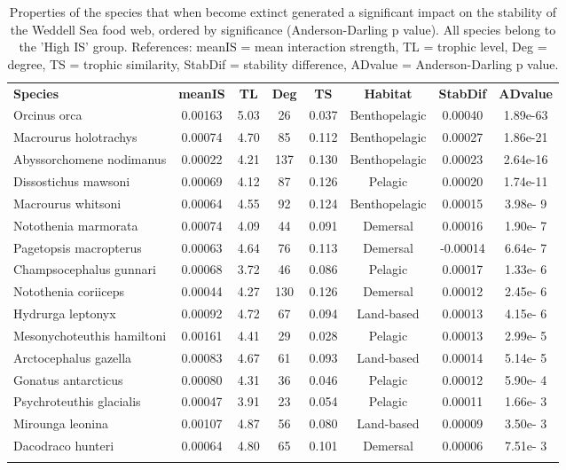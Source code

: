 \documentclass[gc, manuscript]{copernicus}
\begin{document}
\begin{table}[t]
\caption{Properties of the species that when become extinct generated a significant impact on the stability of the Weddell Sea food web, ordered by significance (Anderson-Darling p value). All species belong to the 'High IS' group.  References: meanIS = mean interaction strength, TL = trophic level, Deg = degree, TS = trophic similarity, StabDif = stability difference, ADvalue = Anderson-Darling p value.}
\begin{tabular}{l c c c c c c c}
\tophline

\textbf{Species} & \textbf{meanIS} & \textbf{TL} & \textbf{Deg} & \textbf{TS} & \textbf{Habitat} & \textbf{StabDif} & \textbf{ADvalue}\\
\middlehline
Orcinus orca & 0.00163 & 5.03 & 26 & 0.037 & Benthopelagic & 0.00040 & 1.89e-63 \\
\middlehline
Macrourus holotrachys & 0.00074 & 4.70 & 85 & 0.112 & Benthopelagic & 0.00027 & 1.86e-21 \\
\middlehline
Abyssorchomene nodimanus & 0.00022 & 4.21 & 137 & 0.130 & Benthopelagic & 0.00023 & 2.64e-16 \\
\middlehline
Dissostichus mawsoni & 0.00069 & 4.12 & 87 & 0.126 & Pelagic & 0.00020 & 1.74e-11 \\
\middlehline
Macrourus whitsoni & 0.00064 & 4.55 & 92 & 0.124 & Benthopelagic & 0.00015 & 3.98e- 9 \\
\middlehline
Notothenia marmorata & 0.00074 & 4.09 & 44 & 0.091 & Demersal & 0.00016 & 1.90e- 7 \\
\middlehline
Pagetopsis macropterus & 0.00063 & 4.64 & 76 & 0.113 & Demersal & -0.00014 & 6.64e- 7 \\
\middlehline
Champsocephalus gunnari & 0.00068 & 3.72 & 46 & 0.086 & Pelagic & 0.00017 & 1.33e- 6 \\
\middlehline
Notothenia coriiceps & 0.00044 & 4.27 & 130 & 0.126 & Demersal & 0.00012 & 2.45e- 6 \\
\middlehline
Hydrurga leptonyx & 0.00092 & 4.72 & 67 & 0.094 & Land-based & 0.00013 & 4.15e- 6 \\
\middlehline
Mesonychoteuthis hamiltoni & 0.00161 & 4.41 & 29 & 0.028 & Pelagic & 0.00013 & 2.99e- 5 \\
\middlehline
Arctocephalus gazella & 0.00083 & 4.67 & 61 & 0.093 & Land-based & 0.00014 & 5.14e- 5 \\
\middlehline
Gonatus antarcticus & 0.00080 & 4.31 & 36 & 0.046 & Pelagic & 0.00012 & 5.90e- 4 \\
\middlehline
Psychroteuthis glacialis & 0.00047 & 3.91 & 23 & 0.054 & Pelagic & 0.00011 & 1.66e- 3 \\
\middlehline
Mirounga leonina & 0.00107 & 4.87 & 56 & 0.080 & Land-based & 0.00009 & 3.50e- 3 \\
\middlehline
Dacodraco hunteri & 0.00064 & 4.80 & 65 & 0.101 & Demersal & 0.00006 & 7.51e- 3 \\

\bottomhline
\end{tabular}
\end{table}
\end{document}
